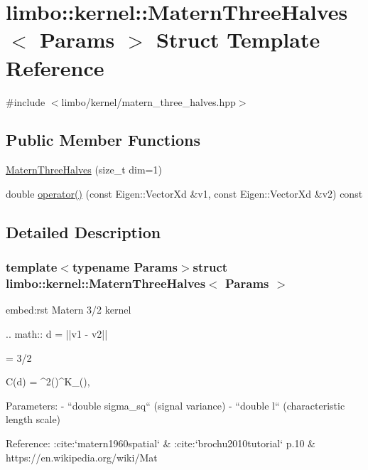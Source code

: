 \hypertarget{structlimbo_1_1kernel_1_1_matern_three_halves}{}\section{limbo\+:\+:kernel\+:\+:Matern\+Three\+Halves$<$ Params $>$ Struct Template Reference}
\label{structlimbo_1_1kernel_1_1_matern_three_halves}


{\ttfamily \#include $<$limbo/kernel/matern\+\_\+three\+\_\+halves.\+hpp$>$}

\subsection*{Public Member Functions}
\begin{DoxyCompactItemize}
\item 
\hyperlink{structlimbo_1_1kernel_1_1_matern_three_halves_a676c205ada09d0ef4ba9ea36d68ba9b9}{Matern\+Three\+Halves} (size\+\_\+t dim=1)
\item 
double \hyperlink{structlimbo_1_1kernel_1_1_matern_three_halves_a9df77c86c2de097bed64edf38a721bb1}{operator()} (const Eigen\+::\+Vector\+Xd \&v1, const Eigen\+::\+Vector\+Xd \&v2) const 
\end{DoxyCompactItemize}


\subsection{Detailed Description}
\subsubsection*{template$<$typename Params$>$struct limbo\+::kernel\+::\+Matern\+Three\+Halves$<$ Params $>$}

\begin{DoxyVerb}embed:rst
 Matern 3/2 kernel

 .. math::
   d = ||v1 - v2||

   \nu = 3/2

   C(d) = \sigma^2\Bigg(\sqrt{2\nu}\Bigg)^\nu K_\nu\Bigg(\sqrt{2\nu}\Bigg),


 Parameters:
  - ``double sigma_sq`` (signal variance)
  - ``double l`` (characteristic length scale)

Reference: :cite:`matern1960spatial` & :cite:`brochu2010tutorial` p.10 & https://en.wikipedia.org/wiki/Mat%
\end{DoxyVerb}
 

